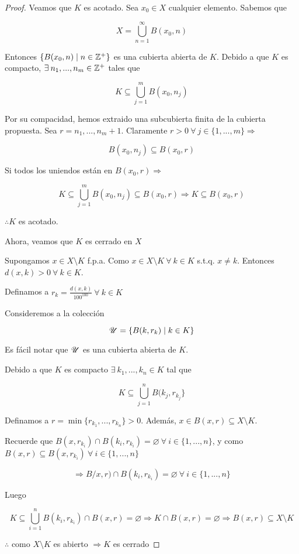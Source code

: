 \begin{proof}
    Veamos que $K$ es acotado. Sea $x_0 \in X$ cualquier elemento. Sabemos que 
    
    $$X = \bigcup_{n=1}^{\infty} B(x_0,n)$$
    
    Entonces $\{ B(x_0,n) \mid n \in \mathbb{Z}^+ \}$ es una cubierta abierta de $K$. Debido a que $K$ es compacto, $\exists \: n_1, ..., n_m \in \mathbb{Z}^+$ tales que

    $$K \subseteq \bigcup_{j=1}^{m} B\left(x_0,n_j\right)$$

    Por su compacidad, hemos extraido una subcubierta finita de la cubierta propuesta. Sea $r = n_1, ..., n_m + 1$. Claramente $r > 0 \: \forall \: j \in \{ 1, ..., m \} \Rightarrow$

    $$B(x_0,n_j) \subseteq B(x_0,r)$$

    Si todos los uniendos están en $B(x_0,r) \Rightarrow$

    $$K \subseteq \bigcup_{j=1}^{m}B(x_0,n_j) \subseteq B(x_0,r) \Rightarrow K \subseteq B(x_0,r)$$

    $\therefore K$ es acotado.

    Ahora, veamos que $K$ es cerrado en $X$

    Supongamos $x \in X \setminus K$ f.p.a. Como $x \in X \setminus K \: \forall \: k \in K$ s.t.q. $x \neq k$. Entonces $d(x,k) > 0 \: \forall \: k \in K$.

    Definamos a $r_k = \frac{d(x,k)}{100^{100}}  \: \forall \: k \in K$

    Consideremos a la colección 

    $$\mathscr{U} = \{ B(k, r_k) \mid k \in K \}$$

    Es fácil notar que $\mathscr{U}$ es una cubierta abierta de $K$. 
    
    Debido a que $K$ es compacto $\exists \: k_1, ..., k_n \in K$ tal que

    $$K \subseteq \bigcup_{j=1}^{n} B(k_j , r_{k_j} \}$$

    Definamos a $r = \min \{ r_{k_1}, ..., r_{k_n} \} > 0$. Además, $x \in B(x,r) \subseteq X \setminus K$.

    Recuerde que $B(x,r_{k_i}) \cap B(k_i,r_{k_i}) = \varnothing \: \forall \: i \in \{ 1, ..., n \}$, y como $B(x,r) \subseteq B(x, r_{k_i}) \: \forall \: i \in \{ 1, ..., n \}$

    $$\Rightarrow B/x,r) \cap B(k_i,r_{k_i}) = \varnothing  \: \forall \: i \in \{ 1, ..., n \}$$

    Luego

    $$K \subseteq \bigcup_{i=1}^{n}B(k_i,r_{k_i}) \cap B(x,r) = \varnothing \Rightarrow K \cap B(x,r) = \varnothing \Rightarrow B(x,r) \subseteq X \setminus K$$

    $\therefore$ como $X \setminus K$ es abierto $\Rightarrow K$ es cerrado
\end{proof}

